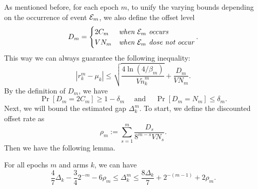As mentioned before, for each epoch $m$, to unify the varying bounds depending on the occurrence of event ${\mathcal{E}}_m$, we also define the offset level
\[D_m = \begin{cases}
    2C_m & \textit{when ${\mathcal{E}}_m$ occurs} \\
    V N_m & \textit{when ${\mathcal{E}}_m$ dose not occur}
\end{cases}.\]
This way we can always guarantee the following inequality:
\[|r_k^m - \mu_k| \leq \sqrt{\frac{4\ln(4/\beta_m)}{V \widetilde{n}_k^m}} + \frac{D_m}{V N_m}.\]
By the definition of $D_m$, we have 
\[\Pr[D_m = 2C_m] \geq 1 - \delta_m \quad \text{ and } \quad \Pr[D_m = N_m] \leq \delta_m.\]
Next, we will bound the estimated gap $\Delta_k^m$. To start, we define the discounted offset rate as
\[\rho_m := \sum_{s=1}^m \frac{D_s}{8^{m-s}VN_s}.\]
Then we have the following lemma.
\begin{lemma}
\label{lem:bsgm} %
    For all epochs $m$ and arms $k$, we can have
    \[\frac{4}{7}\Delta_k - \frac{3}{4}2^{-m} - 6 \rho_m \leq \Delta_k^{m} \leq \frac{8 \Delta_k}{7} + 2^{-(m-1)} + 2\rho_m.\]
\end{lemma}
